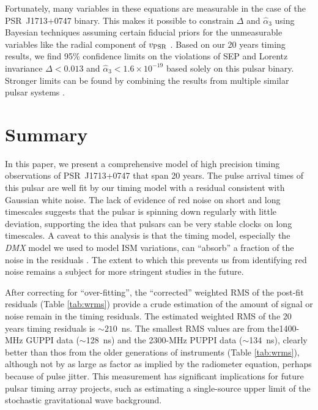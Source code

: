 Fortunately, many variables in these equations are measurable in the
case of the PSR~J1713+0747 binary. This makes it possible to constrain $\Delta$
and $\hat{\alpha}_3$ using Bayesian techniques assuming certain fiducial
priors for the unmeasurable variables like the radial component of
$v_{\rm PSR}$ \citep{sns+05, sfl+05, gsf+11}. Based on our 20 years 
timing results, we find 95\% confidence limits on the violations of SEP and
Lorentz invariance $\Delta < 0.013$ and
$\hat{\alpha}_3<1.6\times10^{-19}$ based solely on this pulsar
binary.  Stronger limits can be found by combining the results from
multiple similar pulsar systems \citep{wex00,sfl+05, gsf+11}.


\section{Summary}
In this paper, we present a comprehensive model of high precision timing observations of
PSR~J1713+0747 that span 20 years. 
The pulse arrival times of this pulsar are well fit by our timing model with a
residual consistent with Gaussian white noise.
The lack of evidence of red noise on short and long timescales suggests that
the pulsar is spinning down regularly with little deviation, supporting the
idea that pulsars can be very stable clocks on long timescales.
A caveat to this analysis is that the timing model, especially the
\textit{DMX} model we used to model ISM variations, can ``absorb'' a fraction
of the noise in the residuals \citep{kcs+13}. The extent to which this prevents us from
identifying red noise remains a subject for more stringent studies in the
future.

After correcting for ``over-fitting'', the ``corrected'' weighted RMS of the post-fit residuals (Table \ref{tab:wrms}) provide a crude estimation of
the amount of signal or noise remain in the timing residuals. The estimated
weighted RMS of the 20 years timing residuals is $\sim 210$~ns. The smallest
RMS values are from the1400-MHz GUPPI data ($\sim$128~ns) and the
2300-MHz PUPPI data ($\sim$134~ns),
clearly better than thos from the older generations of instruments 
(Table \ref{tab:wrms}), although not by as large as factor as implied
by the radiometer equation, perhaps because of pulse jitter. 
This measurement has significant implications for future pulsar timing array
projects, such as estimating a single-source
upper limit of the stochastic gravitational wave background.


